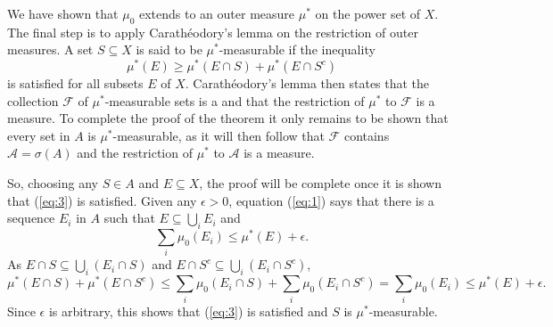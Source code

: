 \documentclass[12pt]{article}
\begin{document}
We have shown that $\mu_0$ extends to an outer measure $\mu^*$ on the power set of $X$. The final step is to apply Carath\'eodory's lemma on the restriction of outer measures. A set $S\subseteq X$ is said to be $\mu^*$-measurable if the inequality
\begin{equation}\label{eq:3}
\mu^*(E)\ge\mu^*(E\cap S)+\mu^*(E\cap S^c)
\end{equation}
is satisfied for all subsets $E$ of $X$. Carath\'eodory's lemma then states that the collection $\mathcal{F}$ of $\mu^*$-measurable sets is a  and that the restriction of $\mu^*$ to $\mathcal{F}$ is a measure.
To complete the proof of the theorem it only remains to be shown that every set in $A$ is $\mu^*$-measurable, as it will then follow that $\mathcal{F}$ contains $\mathcal{A}=\sigma(A)$ and the restriction of $\mu^*$ to $\mathcal{A}$ is a measure.

So, choosing any $S\in A$ and $E\subseteq X$, the proof will be complete once it is shown that (\ref{eq:3}) is satisfied.
Given any $\epsilon>0$, equation (\ref{eq:1}) says that there is a sequence $E_i$ in $A$ such that $E\subseteq\bigcup_iE_i$ and
\begin{equation*}
\sum_i\mu_0(E_i)\le\mu^*(E)+\epsilon.
\end{equation*}
As $E\cap S\subseteq\bigcup_i(E_i\cap S)$ and $E\cap S^c\subseteq\bigcup_i(E_i\cap S^c)$,
\begin{equation*}
\mu^*(E\cap S)+\mu^*(E\cap S^c) \le\sum_i\mu_0(E_i\cap S)+\sum_i\mu_0(E_i\cap S^c)=\sum_i\mu_0(E_i)\le\mu^*(E)+\epsilon.
\end{equation*}
Since $\epsilon$ is arbitrary, this shows that (\ref{eq:3}) is satisfied and $S$ is $\mu^*$-measurable.

\end{document}
